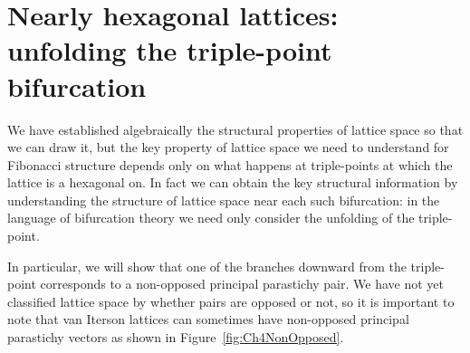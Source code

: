 \section[Unfolding the triple-point bifurcation]{Nearly hexagonal lattices: unfolding the triple-point bifurcation}
We have established algebraically the structural properties of lattice space so that we can draw it, but the key property of lattice space we need to understand for Fibonacci structure depends only on what happens at triple-points at which the lattice is a hexagonal on. In fact we can obtain the key structural information by understanding the structure of lattice space near each such bifurcation: in the language of bifurcation theory we need only consider the unfolding of the triple-point.  

In particular, we will show that one of the branches downward from the triple-point corresponds to a non-opposed principal parastichy pair. We have not yet classified lattice space by whether pairs are opposed or not, so it is important to note that van Iterson lattices can sometimes have non-opposed principal parastichy vectors as shown in  Figure~\ref{fig:Ch4NonOpposed}. 

